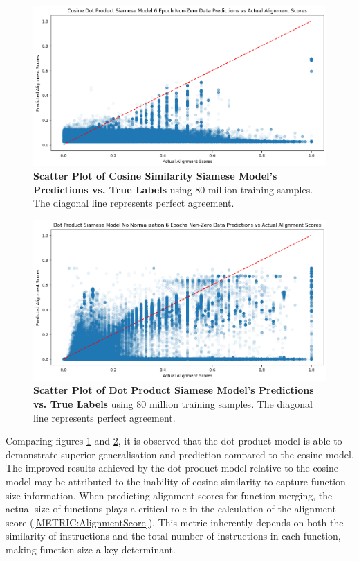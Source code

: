 \begin{figure}[tbh!]
\centering
\includegraphics[scale=0.4]{Figures/ModelArchitecture/Cosine6Epoch.png}
\caption{\textbf{Scatter Plot of Cosine Similarity Siamese Model's Predictions vs. True Labels} using 80 million training samples. The diagonal line represents perfect agreement.} 
\label{fig:CosineSiameseModel}
\end{figure}

\begin{figure}[tbh!]
\centering
\includegraphics[scale=0.4]{Figures/ModelArchitecture/DotProdArchitecture.png}
\caption{\textbf{Scatter Plot of Dot Product Siamese Model's Predictions vs. True Labels} using 80 million training samples. The diagonal line represents perfect agreement.} 
\label{fig:NonNormSiameseModelNonNorm}
\end{figure}

Comparing figures \ref{fig:CosineSiameseModel} and \ref{fig:NonNormSiameseModelNonNorm}, it is observed that the dot product model is able to demonstrate superior generalisation and prediction compared to the cosine model. The improved results achieved by the dot product model relative to the cosine model may be attributed to the inability of cosine similarity to capture function size information. When predicting alignment scores for function merging, the actual size of functions plays a critical role in the calculation of the alignment score (\ref{METRIC:AlignmentScore}). This metric inherently depends on both the similarity of instructions and the total number of instructions in each function, making function size a key determinant.

